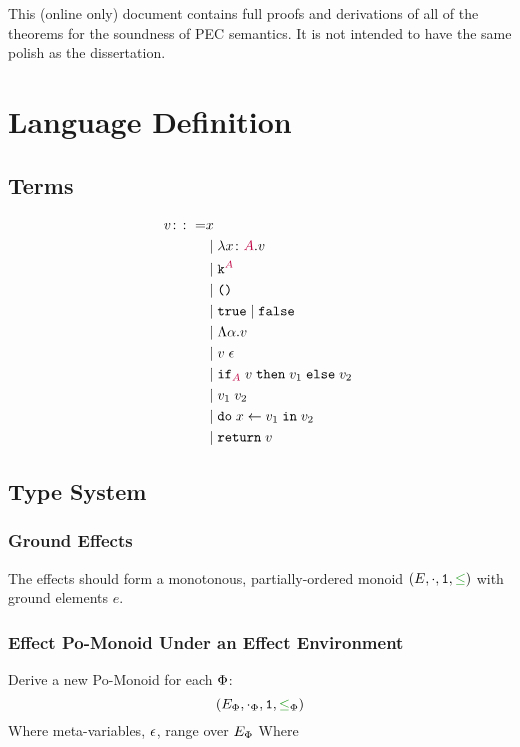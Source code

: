 \documentclass{report}
\begin{document}
\abstract

This (online only) document contains full proofs and derivations of all of the theorems for the soundness of PEC semantics. It is not intended to have the same polish as the dissertation.

\tableofcontents

\chapter{Language Definition}

\section{Terms}

\begin{align*}
        v \gens & x \\
        & \mid \lam{x}{A}{v} \\
        & \mid \const{A} \\
        & \mid \u \\
        & \mid \t \mid \f \\
        & \mid \elam{\a}{v} \\
        & \mid \eapp{v}{\e} \\
        & \mid \pifthenelse{A}{v}{v_1}{v_2} \\
        & \mid \apply{v_1}{v_2} \\
        & \mid \doin{x}{v_1}{v_2} \\
        & \mid \return{v}
\end{align*}



\section{Type System}
\subsection{Ground Effects}
The effects should form a monotonous, partially-ordered monoid $(E, \dot, \1, \subeffect)$ with ground elements $e$.

\subsection{Effect Po-Monoid Under an Effect Environment}

Derive a new Po-Monoid for each $\P$:
\begin{equation}
    (E_\P, \dotp, \1, \subeffectp)
\end{equation}
Where meta-variables, $\e$, range over $E_\P$
Where
\end{document}
